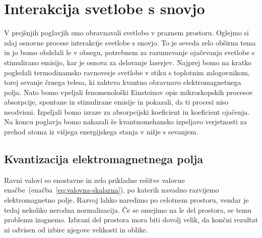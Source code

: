 \chapter{Interakcija svetlobe s snovjo}

V prejšnjih poglavjih smo obravnavali svetlobo v praznem prostoru. Oglejmo si
zdaj osnovne procese interakcije svetlobe s snovjo. To je seveda zelo
obširna tema in jo bomo obdelali le v obsegu, potrebnem za
razumevanje ojačevanja svetlobe s stimulirano emisijo, kar je osnova za
delovanje laserjev. Najprej bomo na kratko pogledali termodinamsko ravnovesje 
svetlobe v stiku s toplotnim zalogovnikom, torej sevanje črnega telesa, ki 
zahteva kvantno obravnavo elektromagnetnega polja. Nato bomo vpeljali fenomenološki
Einsteinov opis mikroskopskih procesov absorpcije, spontane in stimulirane
emisije in pokazali, da ti procesi niso neodvisni. Izpeljali bomo
izraze za absorpcijski koeficient in koeficient ojačenja. Na koncu poglavja
bomo nakazali še kvantnomehansko izpeljavo verjetnosti za prehod
atoma iz višjega energijskega stanja v nižje s sevanjem.

\section{Kvantizacija elektromagnetnega polja}
Ravni valovi so enostavne in zelo prikladne rešitve valovne 
enačbe~(enačba~\ref{eq:valovna-skalarna}), po katerih navadno razvijemo elektromagnetno polje. Razvoj
lahko naredimo po celotnem prostoru, vendar je tedaj nekoliko nerodna normalizacija. 
Če se omejimo na le del prostora, se temu problemu izognemo. Izbrani del prostora 
mora biti dovolj velik, da končni rezultat ni odvisen od izbire 
njegove velikosti in oblike.

